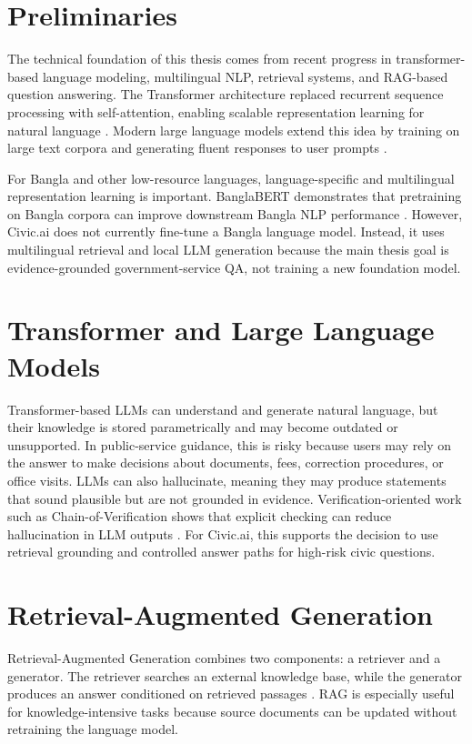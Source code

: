 \section{Preliminaries}
The technical foundation of this thesis comes from recent progress in transformer-based language modeling, multilingual NLP, retrieval systems, and RAG-based question answering. The Transformer architecture replaced recurrent sequence processing with self-attention, enabling scalable representation learning for natural language \cite{vaswani2017attention}. Modern large language models extend this idea by training on large text corpora and generating fluent responses to user prompts \cite{touvron2023llama,dubey2024llama3}.

For Bangla and other low-resource languages, language-specific and multilingual representation learning is important. BanglaBERT demonstrates that pretraining on Bangla corpora can improve downstream Bangla NLP performance \cite{bhattacharjee2021banglabert}. However, Civic.ai does not currently fine-tune a Bangla language model. Instead, it uses multilingual retrieval and local LLM generation because the main thesis goal is evidence-grounded government-service QA, not training a new foundation model.

\section{Transformer and Large Language Models}
Transformer-based LLMs can understand and generate natural language, but their knowledge is stored parametrically and may become outdated or unsupported. In public-service guidance, this is risky because users may rely on the answer to make decisions about documents, fees, correction procedures, or office visits. LLMs can also hallucinate, meaning they may produce statements that sound plausible but are not grounded in evidence. Verification-oriented work such as Chain-of-Verification shows that explicit checking can reduce hallucination in LLM outputs \cite{dhuliawala2023chain}. For Civic.ai, this supports the decision to use retrieval grounding and controlled answer paths for high-risk civic questions.

\section{Retrieval-Augmented Generation}
Retrieval-Augmented Generation combines two components: a retriever and a generator. The retriever searches an external knowledge base, while the generator produces an answer conditioned on retrieved passages \cite{lewis2020rag}. RAG is especially useful for knowledge-intensive tasks because source documents can be updated without retraining the language model.

